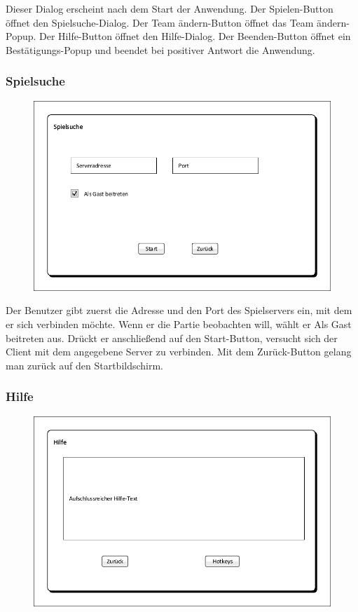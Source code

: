 Dieser Dialog erscheint nach dem Start der Anwendung. Der \glqq{}Spielen\grqq{}-Button öffnet den Spielsuche-Dialog. Der \glqq{}Team ändern\grqq{}-Button öffnet das \glqq{}Team ändern\grqq{}-Popup. Der \glqq{}Hilfe\grqq{}-Button öffnet den Hilfe-Dialog. Der \glqq{}Beenden\grqq{}-Button öffnet ein Bestätigungs-Popup und beendet bei positiver Antwort die Anwendung.

\subsubsection{Spielsuche}
\begin{figure}[H]
    \centering
    \includegraphics[scale=0.8]{../Meilenstein03/images/Spielsuche.pdf}
\end{figure}

Der Benutzer gibt zuerst die Adresse und den Port des Spielservers ein, mit dem er sich verbinden möchte. Wenn er die Partie beobachten will, wählt er \glqq{}Als Gast beitreten\grqq{} aus. Drückt er anschließend auf den \glqq{}Start\grqq{}-Button, versucht sich der Client mit dem angegebene Server zu verbinden. Mit dem \glqq{}Zurück\grqq{}-Button gelang man zurück auf den Startbildschirm.

\subsubsection{Hilfe}
\begin{figure}[H]
    \centering
    \includegraphics[scale=0.8]{../Meilenstein03/images/Hilfe.pdf}
\end{figure}

